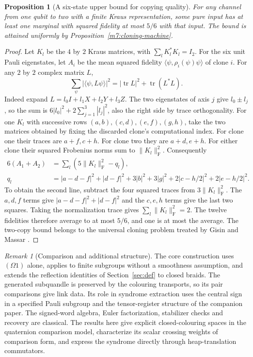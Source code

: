 \documentclass[11pt,reqno]{amsart}
\newtheorem{proposition}[theorem]{Proposition}
\theoremstyle{definition}
\theoremstyle{remark}
\newtheorem{remark}[theorem]{Remark}
\numberwithin{equation}{section}
\begin{document}
\begin{proposition}[A six-state upper bound for copying quality]\label{m7:clone-bound}
For any channel from one qubit to two with a finite Kraus
representation, some pure input has at least one marginal with
squared fidelity at most $5/6$ with that input. The bound is
attained uniformly by Proposition~\ref{m7:cloning-machine}.
\end{proposition}
\begin{proof}
Let $K_l$ be the $4$ by $2$ Kraus matrices, with
$\sum_l K_l^*K_l=I_2$. For the six unit Pauli eigenstates, let $A_i$
be the mean squared fidelity $\langle\psi,\rho_i(\psi)\psi\rangle$
of clone $i$. For any $2$ by $2$ complex matrix $L$,
\[
 \sum_{\psi}|\langle\psi,L\psi\rangle|^2
 = |\operatorname{tr} L|^2+\operatorname{tr}(L^*L).
\]
Indeed expand $L=l_0 I+l_1 X+l_2Y+l_3 Z$. The two eigenstates of
axis $j$ give $l_0\pm l_j$, so the sum is
$6|l_0|^2+2\sum_{j=1}^3|l_j|^2$, also the right side by trace
orthogonality. For one $K_l$ with successive rows
$(a,b),(c,d),(e,f),(g,h)$, take the two matrices obtained by
fixing the discarded clone's computational index. For clone one
their traces are $a+f,c+h$. For clone two they are $a+d,e+h$.
For either clone their squared Frobenius norms sum to
$\|K_l\|_{\mathrm F}^2$. Consequently
\[
\begin{aligned}
 6(A_1+A_2)&=\sum_l(5\|K_l\|_{\mathrm F}^2-q_l),\\
 q_l&=|a-d-f|^2+|d-f|^2+3|b|^2+3|g|^2
                  +2|c-h/2|^2+2|e-h/2|^2 .
\end{aligned}
\]
To obtain the second line, subtract the four squared traces
from $3\|K_l\|_{\mathrm F}^2$. The $a,d,f$ terms give
$|a-d-f|^2+|d-f|^2$ and the $c,e,h$ terms give the last two squares.
Taking the normalization trace gives $\sum_l\|K_l\|_{\mathrm F}^2=2$.
The twelve fidelities therefore average to at most $5/6$,
and one is at most the average. The two-copy bound belongs to
the universal cloning problem treated by Gisin and Massar
\cite{m7:GM}.
\end{proof}

\begin{remark}[Comparison and additional structure]\label{m7:placement}
The core construction uses $(\Omega1)$ alone, applies to finite
subgroups without a smoothness assumption, and extends the
reflection identities of Section~\ref{sec:def} to closed braids.
The generated subquandle is preserved by the colouring transports,
so its pair comparisons give link data. Its role in syndrome extraction uses the central sign
in a specified Pauli subgroup and the tensor-register structure
of the companion paper. The signed-word algebra, Euler
factorization, stabilizer checks and recovery are classical.
The results here give explicit closed-colouring spaces in the
quaternion comparison model, characterize its scalar crossing
weights of comparison form, and express the syndrome directly
through heap-translation commutators.
\end{remark}
\end{document}
